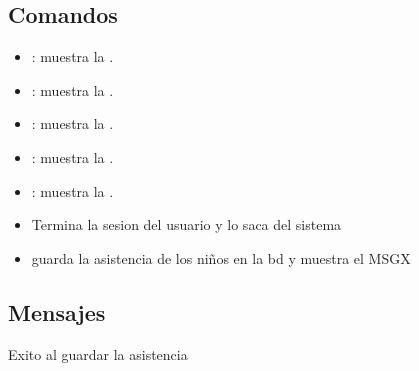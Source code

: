 \subsection{Comandos}
\begin{itemize}
	\item {}: muestra la .
        \item {}: muestra la .
        \item {}: muestra la .
        \item {}: muestra la .
        \item {}: muestra la .
        \item {}Termina la sesion del usuario y lo saca del sistema
        \item {} guarda la asistencia de los niños en la bd y muestra el MSGX
\end{itemize}


\subsection{Mensajes}

\begin{Citemize}
	\item Exito al guardar la asistencia
\end{Citemize}

